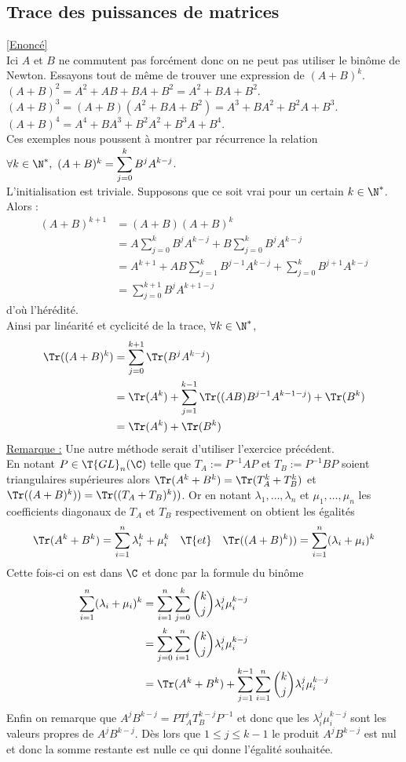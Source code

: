 \documentclass[8pt]{book}
\begin{document}
	\subsection{Trace des puissances de matrices }
	\label{Trace des puissances de matrices corrigé}
	\textcolor{blue}{\hyperref[Trace des puissances de matrices]{[Enoncé]}}\\
	Ici $A$ et $B$ ne commutent pas forcément donc on ne peut pas utiliser le binôme de Newton. Essayons tout de même de trouver une expression de $(A+B)^k$.\\
	$(A+B)^2=A^2+AB+BA+B^2=A^2+BA+B^2$.\\
	$(A+B)^3=(A+B)(A^2+BA+B^2)=A^3+BA^2+B^2A+B^3$.\\
	$(A+B)^4=A^4+BA^3+B^2A^2+B^3A+B^4$.\\
	Ces exemples nous poussent à montrer par récurrence la relation $\forall k\in \N^*,\ (A+B)^k=\displaystyle\sum_{j=0}^kB^jA^{k-j}$.\\
	L'initialisation est triviale. Supposons que ce soit vrai pour un certain $k\in \N^*$. Alors :
	\begin{align*}
		(A+B)^{k+1}&=(A+B)(A+B)^k\\
		&=A\sum_{j=0}^kB^jA^{k-j}+B\sum_{j=0}^kB^jA^{k-j}\\
		&=A^{k+1}+AB\sum_{j=1}^kB^{j-1}A^{k-j}+\sum_{j=0}^kB^{j+1}A^{k-j}\\
		&=\sum_{j=0}^{k+1}B^jA^{k+1-j}
	\end{align*}
	d'où l'hérédité.\\
	Ainsi par linéarité et cyclicité de la trace, $\forall k\in \N^*$,
	\begin{align*}
		\Tr((A+B)^k)&=\sum_{j=0}^{k+1}\Tr(B^jA^{k-j})\\
		&=\Tr(A^k)+\sum_{j=1}^{k-1}\Tr((AB)B^{j-1}A^{k-1-j})+\Tr(B^k)\\
		&=\Tr(A^k)+\Tr(B^k)
	\end{align*}
	\underline{Remarque :} Une autre méthode serait d'utiliser l'exercice précédent.\\
	En notant $P\in \T{GL}_n(\C)$ telle que $T_A:=P^{-1}AP$ et $T_B:=P^{-1}BP$ soient triangulaires supérieures alors $\Tr(A^k+B^k)=\Tr(T_A^k+T_B^k)$ et $\Tr((A+B)^k))=\Tr((T_A+T_B)^k))$. Or en notant $\lambda_1,\dots,\lambda_n$ et $\mu_1,\dots,\mu_n$ les coefficients diagonaux de $T_A$ et $T_B$ respectivement on obtient les égalités $$\Tr(A^k+B^k)=\sum_{i=1}^n\lambda_i^k+\mu_i^k\quad\T{et}\quad\Tr((A+B)^k))=\sum_{i=1}^n(\lambda_i+\mu_i)^k$$
	Cette fois-ci on est dans $\C$ et donc par la formule du binôme
	\begin{align*}
		\sum_{i=1}^n(\lambda_i+\mu_i)^k&=\sum_{i=1}^n\sum_{j=0}^k\binom{k}{j}\lambda_i^j\mu_i^{k-j}\\
		&=\sum_{j=0}^k\sum_{i=1}^n\binom{k}{j}\lambda_i^j\mu_i^{k-j}\\
		&=\Tr(A^k+B^k)+\sum_{j=1}^{k-1}\sum_{i=1}^n\binom{k}{j}\lambda_i^j\mu_i^{k-j}
	\end{align*}
	Enfin on remarque que $A^jB^{k-j}=PT_A^jT_B^{k-j}P^{-1}$ et donc que les $\lambda_i^j\mu_i^{k-j}$ sont les valeurs propres de $A^jB^{k-j}$. Dès lors que $1\leq j\leq k-1$ le produit $A^jB^{k-j}$ est nul et donc la somme restante est nulle ce qui donne l'égalité souhaitée.
	
\end{document}
